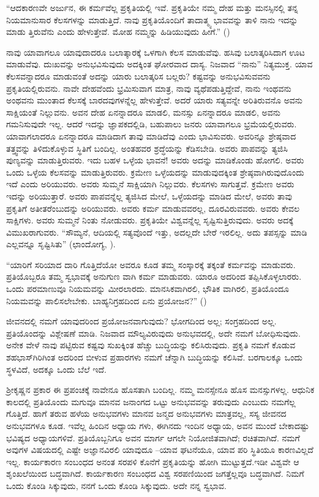 “ಆದಕಾರಣವೇ ಅರ್ಜುನ, ಈ ಕರ್ಮವೆಲ್ಲ ಪ್ರಕೃತಿಯಲ್ಲಿ ಇವೆ. ಪ್ರಕೃತಿಯೇ ನಮ್ಮ ದೇಹ ಮತ್ತು ಮನಸ್ಸಿನಲ್ಲಿ ತನ್ನ ನಿಯಮಾನುಸಾರ ಕೆಲಸಗಳನ್ನು ಮಾಡುತ್ತಿದೆ. ನಾವು ಪ್ರಕೃತಿಯೊಂದಿಗೆ ತಾದಾತ್ಮ್ಯ ಭಾವವನ್ನು ತಾಳಿ ನಾನು ಇದನ್ನು ಮಾಡು ತ್ತಿರುವೆನು ಎಂದು ಹೇಳುತ್ತೇವೆ. ಮೋಹ ನಮ್ಮನ್ನು ಹಿಡಿಯುವುದು ಹೀಗೆ.” ()

ನಾವು ಯಾವಾಗಲೂ ಯಾವುದಾದರೂ ಬಲಾತ್ಕಾರಕ್ಕೆ ಒಳಗಾಗಿ ಕೆಲಸ ಮಾಡುವೆವು. ಹಸಿವು ಬಲಾತ್ಕರಿಸಿದಾಗ ಊಟ ಮಾಡುವೆವು. ದುಃಖವನ್ನು ಅನುಭವಿಸುವುದು ಅದಕ್ಕಿಂತ ಘೋರವಾದ ದಾಸ್ಯ. ನಿಜವಾದ “ನಾನು” ನಿತ್ಯಮುಕ್ತ. ಯಾವ ಕೆಲಸವನ್ನಾದರೂ ಮಾಡುವಂತೆ ಅದನ್ನು ಯಾರು ಬಲಾತ್ಕರಿಸ ಬಲ್ಲರು? ಕಷ್ಟವನ್ನು ಅನುಭವಿಸುವವನು ಪ್ರಕೃತಿಯಲ್ಲಿರುವನು. ನಾವೇ ದೇಹವೆಂದು ಭ್ರಮಿಸುವಾಗ ಮಾತ್ರ, ನಾವು ವ್ಯಥೆಪಡುತ್ತಿದ್ದೇವೆ, ನಾನು ಇಂಥವನು ಅಂಥವನು ಮುಂತಾದ ಕೆಲಸಕ್ಕೆ ಬಾರದವುಗಳನ್ನೆಲ್ಲ ಹೇಳುತ್ತೇವೆ. ಅದರೆ ಯಾರು ಸತ್ಯವನ್ನೇ ಅರಿತಿರುವನೊ ಅವನು ಸಾಕ್ಷಿಯಂತೆ ನಿಲ್ಲುವನು. ಅವನ ದೇಹ ಏನನ್ನಾದರೂ ಮಾಡಲಿ, ಮನಸ್ಸು ಏನನ್ನಾದರೂ ಮಾಡಲಿ, ಅವನು ಗಮನಿಸುವುದೇ ಇಲ್ಲ. ಆದರೆ ಇದನ್ನು ಜ್ಞಾಪಕದಲ್ಲಿಡಿ, ಬಹುಪಾಲು ಜನರು ಯಾವಾಗಲೂ ಭ್ರಮೆಯಲ್ಲಿರುವರು. ಯಾವಾಗಲಾದರೂ ಏನನ್ನಾದರೂ ಮಾಡಿದಾಗ ತಾವು ಮಾಡಿದೆವು ಎಂದು ಭಾವಿಸುವರು. ಅವರಿನ್ನೂ ಶ್ರೇಷ್ಠವಾದ ತತ್ತ್ವವನ್ನು ತಿಳಿದುಕೊಳ್ಳುವ ಸ್ಥಿತಿಗೆ ಬಂದಿಲ್ಲ. ಅಂತಹವರ ಶ್ರದ್ಧೆಯನ್ನು ಕೆಡಿಸಬೇಡಿ. ಅವರು ಪಾಪವನ್ನು ತ್ಯಜಿಸಿ ಪುಣ್ಯವನ್ನು ಮಾಡುತ್ತಿರುವರು. ಇದು ಬಹಳ ಒಳ್ಳೆಯ ಭಾವನೆ! ಅವರು ಅದನ್ನು ಮಾಡಿಕೊಂಡು ಹೋಗಲಿ. ಅವರು ಒಂದು ಒಳ್ಳೆಯ ಕೆಲಸವನ್ನು ಮಾಡುತ್ತಿರುವರು. ಕ್ರಮೇಣ ಒಳ್ಳೆಯದನ್ನು ಮಾಡುವುದಕ್ಕಿಂತ ಶ್ರೇಷ್ಠವಾಗಿರುವುದೊಂದು ಇದೆ ಎಂದು ಅರಿಯುವರು. ಅವರು ಸುಮ್ಮನೆ ಸಾಕ್ಷಿಯಾಗಿ ನಿಲ್ಲುವರು. ಕೆಲಸಗಳು ಸಾಗುತ್ತವೆ. ಕ್ರಮೇಣ ಅವರು ಇದನ್ನು ಅರಿಯುತ್ತಾರೆ. ಅವರು ಪಾಪವನ್ನೆಲ್ಲ ತ್ಯಜಿಸಿದ ಮೇಲೆ, ಒಳ್ಳೆಯದನ್ನು ಮಾಡಿದ ಮೇಲೆ, ಅವರು ತಾವು ಪ್ರಕೃತಿಗೆ ಅತೀತರೆಂಬುದನ್ನು ಅರಿಯುವರು. ಅವರು ಕರ್ಮ ಮಾಡುವವರಲ್ಲ, ದೂರವಿರುವವರು. ಅವರು ಕೇವಲ ಸಾಕ್ಷಿಗಳು. ಅವರು ಸುಮ್ಮನೆ ನಿಂತು ನೋಡುವರು. ಪ್ರಕೃತಿಯೇ ವಿಶ್ವವನ್ನೆಲ್ಲ ಸೃಷ್ಟಿಸುತ್ತಿರುವುದು. ಅವರು ಅದಕ್ಕೆ ವಿಮುಖರಾಗುವರು. “ಸೌಮ್ಯನೆ, ಆದಿಯಲ್ಲಿ ಸತ್ಯವೊಂದೆ ಇತ್ತು, ಅದಲ್ಲದೇ ಬೇರೆ ಇರಲಿಲ್ಲ. ಅದು ತಪಸ್ಸನ್ನು ಮಾಡಿ ಎಲ್ಲವನ್ನೂ ಸೃಷ್ಟಿಸಿತು” (ಛಾಂದೋಗ್ಯ, ).

“ಯಾರಿಗೆ ಸರಿಯಾದ ದಾರಿ ಗೊತ್ತಿದೆಯೋ ಅವರೂ ಕೂಡ ತಮ್ಮ ಸಂಸ್ಕಾರಕ್ಕೆ ತಕ್ಕಂತೆ ಕರ್ಮವನ್ನು ಮಾಡುವರು. ಪ್ರತಿಯೊಬ್ಬರೂ ತಮ್ಮ ಸ್ವಭಾವಕ್ಕೆ ಅನುಗುಣ ವಾಗಿ ಕರ್ಮ ಮಾಡುವರು. ಯಾರೂ ಅದರಿಂದ ತಪ್ಪಿಸಿಕೊಳ್ಳಲಾರರು. ಒಂದು ಪರಮಾಣುವೂ ನಿಯಮವನ್ನು ಮೀರಲಾರದು. ಮಾನಸಿಕವಾಗಿರಲಿ, ಭೌತಿಕ ವಾಗಿರಲಿ, ಪ್ರತಿಯೊಂದೂ ನಿಯಮವನ್ನು ಪಾಲಿಸಲೇಬೇಕು. ಬಾಹ್ಯನಿಗ್ರಹದಿಂದ ಏನು ಪ್ರಯೋಜನ?” ()

ಜೀವನದಲ್ಲಿ ನಮಗೆ ಯಾವುದರಿಂದ ಪ್ರಯೋಜನವಾಗುವುದು? ಭೋಗದಿಂದ ಅಲ್ಲ; ಸಂಗ್ರಹದಿಂದ ಅಲ್ಲ. ಪ್ರತಿಯೊಂದನ್ನು ವಿಶ್ಲೇಷಣೆ ಮಾಡಿ. ನಿಜವಾದ ಮೌಲ್ಯವಿರುವುದು ಅನುಭವದಲ್ಲಿ, ಅದೇ ನಮಗೆ ಬೋಧಿಸುವುದು. ಅನೇಕ ವೇಳೆ ನಾವು ಪಟ್ಟಿರುವ ಕಷ್ಟವು ಸುಖಕ್ಕಿಂತ ಹೆಚ್ಚು ಬುದ್ಧಿಯನ್ನು ಕಲಿಸಿರುವುದು. ಪ್ರಕೃತಿ ನಮಗೆ ಕೊಡುವ ಶಹಭಾಸ್​ಗಿರಿಗಿಂತ ಅದರಿಂದ ಬೀಳುವ ಪ್ರಹಾರಗಳು ನಮಗೆ ಚೆನ್ನಾಗಿ ಬುದ್ಧಿಯನ್ನು ಕಲಿಸಿವೆ. ಬರಗಾಲಕ್ಕೂ ಒಂದು ಸ್ಥಳವಿದೆ, ಅದಕ್ಕೂ ಒಂದು ಬೆಲೆ ಇದೆ.

ಶ‍್ರೀಕೃಷ್ಣನ ಪ್ರಕಾರ ಈ ಪ್ರಪಂಚಕ್ಕೆ ನಾವೇನೂ ಹೊಸತಾಗಿ ಬಂದಿಲ್ಲ. ನಮ್ಮ ಮನಸ್ಸೇನೂ ಹೊಸ ಮನಸ್ಸುಗಳಲ್ಲ. ಆಧುನಿಕ ಕಾಲದಲ್ಲಿ ಪ್ರತಿಯೊಂದು ಮಗುವೂ ಮಾನವ ಜನಾಂಗದ ಒಟ್ಟು ಅನುಭವವನ್ನು ತರುವುದು ಎಂಬುದು ನಮಗೆಲ್ಲ ಗೊತ್ತಿದೆ. ಹಾಗೆ ತರುವ ಹಳೆಯ ಅನುಭವಗಳು ಮಾನವ ಜನ್ಮದ ಅನುಭವಗಳು ಮಾತ್ರವಲ್ಲ, ಸಸ್ಯ ಜೀವನದ ಅನುಭವಗಳೂ ಕೂಡ. ಇವೆಲ್ಲ ಹಿಂದಿನ ಅಧ್ಯಾಯ ಗಳು, ಈಗಿನದು ಇಂದಿನ ಅಧ್ಯಾಯ, ಅವನ ಮುಂದೆ ಬೇಕಾದಷ್ಟು ಭವಿಷ್ಯದ ಅಧ್ಯಾಯಗಳಿವೆ. ಪ್ರತಿಯೊಬ್ಬನಿಗೂ ಅವನ ಮಾರ್ಗ ಆಗಲೇ ನಿಯೋಜಿತವಾಗಿದೆ; ರಚಿತವಾಗಿದೆ. ನಮಗೆ ಅವುಗಳ ವಿಷಯದಲ್ಲಿ ಎಷ್ಟೇ ಅಜ್ಞಾನವಿರಲಿ ಯಾವುದೂ –ಯಾವ ಘಟನೆಯೂ, ಯಾವ ಪರಿ ಸ್ಥಿತಿಯೂ ಕಾರಣವಿಲ್ಲದೆ ಇಲ್ಲ. ಕಾರ್ಯಕಾರಣ ಸಂಬಂಧದ ಅನಂತ ಸರಪಳಿ ಕೊನೆಗೆ ಪ್ರಕೃತಿಯನ್ನು ಹೋಗಿ ಮುಟ್ಟುತ್ತದೆ.ಇಡೀ ವಿಶ್ವವೇ ಆ ಶೃಂಖಲೆಯಿಂದ ಬದ್ಧವಾಗಿದೆ. ಕಾರ್ಯಕಾರಣ ಸಂಬಂಧದ ವಿಶ್ವ ಸರಪಣಿಯಿಂದ ಜಗತ್ತೆಲ್ಲವೂ ಬದ್ಧವಾಗಿದೆ. ನಿಮಗೆ ಒಂದು ಕೊಂಡಿ ಸಿಕ್ಕುವುದು, ನನಗೆ ಒಂದು ಕೊಂಡಿ ಸಿಕ್ಕುವುದು. ಅದೇ ನನ್ನ ಸ್ವಭಾವ.


